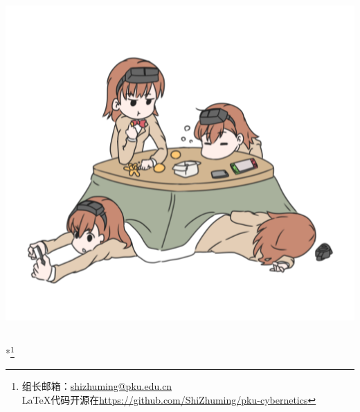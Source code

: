 \documentclass[12pt,AutoFakeBold,aspectratio=43,mathserif]{beamer}
\begin{document}
\begin{frame}
\begin{columns}
            \begin{column}{.5\linewidth}
                \includegraphics[width=.4\paperwidth]{figures/misaka558.png}
            \end{column}
        \end{columns}
        *\footnote{组长邮箱：\href{mailto:shizhuming@pku.edu.cn}{shizhuming@pku.edu.cn} \\ LaTeX代码开源在\url{https://github.com/ShiZhuming/pku-cybernetics}}
    \end{frame}
    
\end{document}
